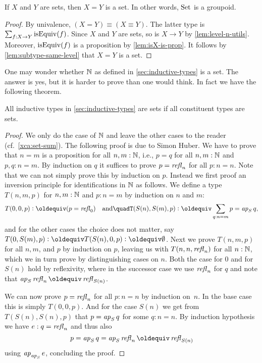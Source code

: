 \begin{lemma}\label{lem:Set-is-groupoid}
If $X$ and $Y$ are sets, then $X=Y$ is a set. 
In other words, $\mathord{\mathrm{Set}}$ is a groupoid.
\end{lemma}

\begin{proof}
By univalence, $(X=Y) \equiv (X\equiv Y)$. The latter type is
$\sum_{f:X\to Y} \mathrm{isEquiv}(f)$. Since $X$ and $Y$ are sets,
so is $X\to Y$ by \cref{lem:level-n-utils}. Moreover,
$\mathrm{isEquiv}(f)$ is a proposition by \cref{lem:isX-is-prop}.
It follows by \cref{lem:subtype-same-level} that $X=Y$ is a set.  
\end{proof}

One may wonder whether $\mathbb{N}$ as defined in \cref{sec:inductive-types}
is a set. The answer is yes, but it is harder to prove than one
would think. In fact we have the following theorem.

\begin{theorem}\label{thm:isset-inductive-types}
All inductive types in \cref{sec:inductive-types} are sets
if all constituent types are sets.
\end{theorem}

\begin{proof}
  We only do the case of $\mathbb{N}$ and leave the other cases to the reader
  (cf.\ \cref{xca:set-sum}). The following proof is due to Simon Huber.
  We have to prove that $n=m$ is a
  proposition for all $n,m:\mathbb{N}$, i.e., $p = q$ for all $n,m : \mathbb{N}$ and
  $p, q : n = m$.  By induction on $q$ it suffices to prove $p = \mathop{{\it refl}_{n}}$ for all $p : n = n$.  Note that we can not simply prove this by
  induction on $p$.  Instead we first proof an inversion principle for
  identifications in $\mathbb{N}$ as follows.  We define a type $T(n,m,p)$
  for $n, m : \mathbb{N}$ and $p : n = m$ by induction on $n$ and $m$:
  \[
    T(0,0,p) \defeq (p = \refl{0})%
    \quad \text{and} \quad%
    T(S(n), S(m), p) \defeq \sum_{q : n = m} p = \ap S q,%
  \]
  and for the other cases the choice does not matter, say $T(0, S(m),
  p) \defeq T(S(n), 0 ,p) \defeq \emptytype$.  Next we prove $T(n,m,p)$
  for all $n,m$, and $p$ by induction on $p$, leaving us with
  $T(n,n,\mathop{{\it refl}_{n}})$ for all $n : \mathbb{N}$, which we in turn prove by
  distinguishing cases on $n$.  Both the case for $0$ and for $S(n)$
  hold by reflexivity, where in the successor case we use $\mathop{{\it refl}_{n}}$
  for $q$ and note that $\ap S \refl{n} \jdeq \refl{S(n)}$.

  We can now prove $p = \mathop{{\it refl}_{n}}$ for all $p : n = n$ by induction
  on~$n$.  In the base case this is simply $T(0,0,p)$.  And for the
  case $S(n)$ we get from $T(S(n),S(n),p)$ that $p = \mathop{{\it ap}_{S}} q$ for
  some $q : n = n$.  By induction hypothesis we have $e : q =
  \mathop{{\it refl}_{n}}$ and thus also
  \[
    p = \ap{S} q = \ap{S} \refl{n} \jdeq \refl{S (n)}
  \]
  using $\mathop{{\it ap}_{\mathop{{\it ap}_{S}}}} e$, concluding the proof.
\end{proof}

